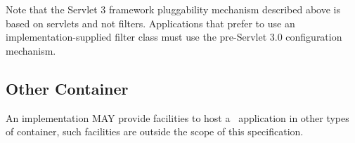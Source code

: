 Note that the Servlet 3 framework pluggability mechanism described above is based on servlets and not filters. Applications that prefer to use an  implementation-supplied filter class must use the pre-Servlet 3.0 configuration mechanism.

\subsection{Other Container}

An implementation MAY provide facilities to host a \jaxrs\ application in other types of container, such facilities are outside the scope of this specification.